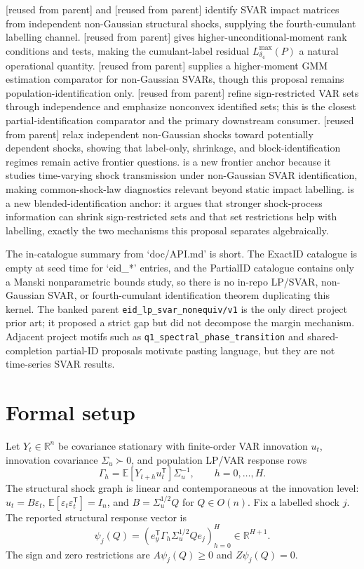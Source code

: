 \documentclass[11pt]{article}
\newcommand{\E}{\mathbb{E}}
\newcommand{\transpose}{\mathsf{T}}
\newcommand{\R}{\mathbb{R}}
\theoremstyle{definition}
\theoremstyle{plain}
\theoremstyle{remark}
\begin{document}
\citet{GourierouxMonfortRenne2017} [reused from parent] and \citet{LanneMeitzSaikkonen2017} [reused from parent] identify SVAR impact matrices from independent non-Gaussian structural shocks, supplying the fourth-cumulant labelling channel.  \citet{Guay2021} [reused from parent] gives higher-unconditional-moment rank conditions and tests, making the cumulant-label residual \(L_{\delta_4}^{\max}(P)\) a natural operational quantity.  \citet{LanneLuoto2021} [reused from parent] supplies a higher-moment GMM estimation comparator for non-Gaussian SVARs, though this proposal remains population-identification only.  \citet{DrautzburgWright2023} [reused from parent] refine sign-restricted VAR sets through independence and emphasize nonconvex identified sets; this is the closest partial-identification comparator and the primary downstream consumer.  \citet{LanneLiuLuoto2026} [reused from parent] relax independent non-Gaussian shocks toward potentially dependent shocks, showing that label-only, shrinkage, and block-identification regimes remain active frontier questions.  \citet{LutkepohlStrohsal2026} is a new frontier anchor because it studies time-varying shock transmission under non-Gaussian SVAR identification, making common-shock-law diagnostics relevant beyond static impact labelling.  \citet{CarrieroMarcellinoTornese2024} is a new blended-identification anchor: it argues that stronger shock-process information can shrink sign-restricted sets and that set restrictions help with labelling, exactly the two mechanisms this proposal separates algebraically.

The in-catalogue summary from `doc/API.md' is short.  The ExactID catalogue is empty at seed time for `eid_*' entries, and the PartialID catalogue contains only a Manski nonparametric bounds study, so there is no in-repo LP/SVAR, non-Gaussian SVAR, or fourth-cumulant identification theorem duplicating this kernel.  The banked parent \texttt{eid\_lp\_svar\_nonequiv/v1} is the only direct project prior art; it proposed a strict gap but did not decompose the margin mechanism.  Adjacent project motifs such as \texttt{q1\_spectral\_phase\_transition} and shared-completion partial-ID proposals motivate pasting language, but they are not time-series SVAR results.

\section{Formal setup}
Let \(Y_t\in\R^n\) be covariance stationary with finite-order VAR innovation \(u_t\), innovation covariance \(\Sigma_u\succ0\), and population LP/VAR response rows
\[
\Gamma_h=\E[Y_{t+h}u_t^\transpose]\Sigma_u^{-1},\qquad h=0,\ldots,H.
\]
The structural shock graph is linear and contemporaneous at the innovation level: \(u_t=B\varepsilon_t\), \(\E[\varepsilon_t\varepsilon_t^\transpose]=I_n\), and \(B=\Sigma_u^{1/2}Q\) for \(Q\in O(n)\).  Fix a labelled shock \(j\).  The reported structural response vector is
\[
\psi_j(Q)=\left(e_y^\transpose\Gamma_h\Sigma_u^{1/2}Qe_j\right)_{h=0}^H\in\R^{H+1}.
\]
The sign and zero restrictions are \(A\psi_j(Q)\ge0\) and \(Z\psi_j(Q)=0\).
\end{document}
